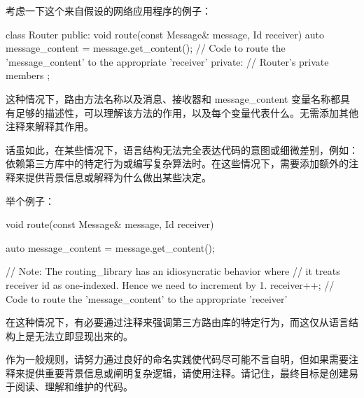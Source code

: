 考虑一下这个来自假设的网络应用程序的例子：

\begin{cpp}
class Router {
public:
    void route(const Message& message, Id receiver) {
        auto message_content = message.get_content();
        // Code to route the 'message_content' to the appropriate 'receiver'
    }
private:
    // Router's private members
};
\end{cpp}

这种情况下，路由方法名称以及消息、接收器和 message\_content 变量名称都具有足够的描述性，可以理解该方法的作用，以及每个变量代表什么。无需添加其他注释来解释其作用。

话虽如此，在某些情况下，语言结构无法完全表达代码的意图或细微差别，例如：依赖第三方库中的特定行为或编写复杂算法时。在这些情况下，需要添加额外的注释来提供背景信息或解释为什么做出某些决定。

举个例子：

\begin{cpp}
void route(const Message& message, Id receiver) {
    auto message_content = message.get_content();

    // Note: The routing_library has an idiosyncratic behavior where
    // it treats receiver id as one-indexed. Hence we need to
    increment by 1.
    receiver++;
    // Code to route the 'message_content' to the appropriate 'receiver'
}
\end{cpp}

在这种情况下，有必要通过注释来强调第三方路由库的特定行为，而这仅从语言结构上是无法立即显现出来的。

作为一般规则，请努力通过良好的命名实践使代码尽可能不言自明，但如果需要注释来提供重要背景信息或阐明复杂逻辑，请使用注释。请记住，最终目标是创建易于阅读、理解和维护的代码。








